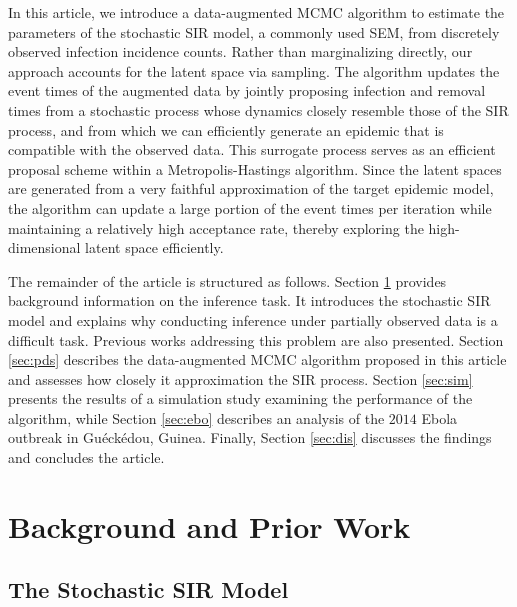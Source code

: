 \documentclass[11pt]{article}
\begin{document}
	In this article, we introduce a data-augmented MCMC algorithm to estimate the parameters of the stochastic SIR model, a commonly used SEM, from discretely observed infection incidence counts. Rather than marginalizing directly, our approach accounts for the latent space via sampling. The algorithm updates the event times of the augmented data by jointly proposing infection and removal times from a stochastic process whose dynamics closely resemble those of the SIR process, and from which we can efficiently generate an epidemic that is compatible with the observed data. This surrogate process serves as an efficient proposal scheme within a Metropolis-Hastings algorithm. Since the latent spaces are generated from a very faithful approximation of the target epidemic model, the algorithm can update a large portion of the event times per iteration while maintaining a relatively high acceptance rate, thereby exploring the high-dimensional latent space efficiently.
	
	The remainder of the article is structured as follows. Section \ref{sec:set} provides background information on the inference task. It introduces the stochastic SIR model and explains why conducting inference under partially observed data is a difficult task. Previous works addressing this problem are also presented. Section \ref{sec:pds} describes the data-augmented MCMC algorithm proposed in this article and assesses how closely it approximation the SIR process. Section \ref{sec:sim} presents the results of a simulation study examining the performance of the algorithm, while Section \ref{sec:ebo} describes an analysis of the $2014$ Ebola outbreak in Gu\'eck\'edou, Guinea. Finally, Section \ref{sec:dis} discusses the findings and concludes the article.
		
	\section{Background and Prior Work}
	\label{sec:set}
		
	\subsection{The Stochastic SIR Model}
	\label{sec:sir}
	
\end{document}
